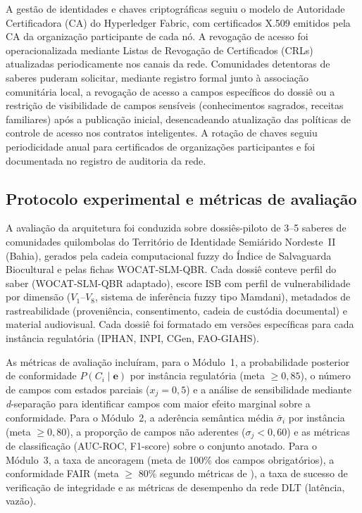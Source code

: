 \documentclass[preprint,12pt,authoryear]{elsarticle}
\begin{document}
A gestão de identidades e chaves criptográficas seguiu o modelo de Autoridade Certificadora (CA) do Hyperledger Fabric, com certificados X.509 emitidos pela CA da organização participante de cada nó. A revogação de acesso foi operacionalizada mediante Listas de Revogação de Certificados (CRLs) atualizadas periodicamente nos canais da rede. Comunidades detentoras de saberes puderam solicitar, mediante registro formal junto à associação comunitária local, a revogação de acesso a campos específicos do dossiê ou a restrição de visibilidade de campos sensíveis (conhecimentos sagrados, receitas familiares) após a publicação inicial, desencadeando atualização das políticas de controle de acesso nos contratos inteligentes. A rotação de chaves seguiu periodicidade anual para certificados de organizações participantes e foi documentada no registro de auditoria da rede.

\subsection{Protocolo experimental e métricas de avaliação}
\label{subsec:protocol_cap5}

A avaliação da arquitetura foi conduzida sobre dossiês-piloto de 3--5 saberes de comunidades quilombolas do Território de Identidade Semiárido Nordeste~II (Bahia), gerados pela cadeia computacional fuzzy do Índice de Salvaguarda Biocultural e pelas fichas WOCAT-SLM-QBR. Cada dossiê conteve perfil do saber (WOCAT-SLM-QBR adaptado), escore ISB com perfil de vulnerabilidade por dimensão ($V_1$--$V_8$, sistema de inferência fuzzy tipo Mamdani), metadados de rastreabilidade (proveniência, consentimento, cadeia de custódia documental) e material audiovisual. Cada dossiê foi formatado em versões específicas para cada instância regulatória (IPHAN, INPI, CGen, FAO-GIAHS).

As métricas de avaliação incluíram, para o Módulo~1, a probabilidade posterior de conformidade $P(C_i \mid \mathbf{e})$ por instância regulatória (meta $\geq 0{,}85$), o número de campos com estados parciais ($x_j = 0{,}5$) e a análise de sensibilidade mediante \textit{d}-separação para identificar campos com maior efeito marginal sobre a conformidade. Para o Módulo~2, a aderência semântica média $\bar{\sigma}_i$ por instância (meta $\geq 0{,}80$), a proporção de campos não aderentes ($\sigma_j < 0{,}60$) e as métricas de classificação (AUC-ROC, F1-score) sobre o conjunto anotado. Para o Módulo~3, a taxa de ancoragem (meta de 100\% dos campos obrigatórios), a conformidade FAIR (meta $\geq$ 80\% segundo métricas de \citet{Wilkinson2016}), a taxa de sucesso de verificação de integridade e as métricas de desempenho da rede DLT (latência, vazão).
\end{document}
